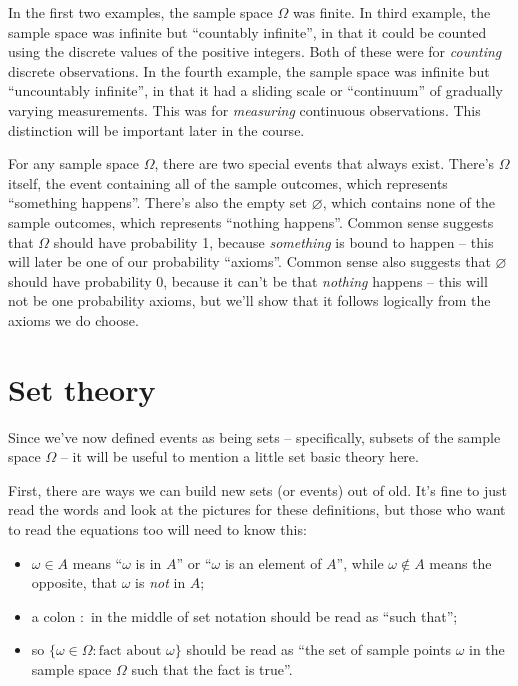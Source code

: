 \documentclass[
  letterpaper,
]{report}
\providecommand{\tightlist}{%
  \setlength{\itemsep}{0pt}\setlength{\parskip}{0pt}}\usepackage{longtable,booktabs,array}
\theoremstyle{definition}
\theoremstyle{definition}
\theoremstyle{remark}
\begin{document}
In the first two examples, the sample space \(\Omega\) was finite. In
third example, the sample space was infinite but ``countably infinite'',
in that it could be counted using the discrete values of the positive
integers. Both of these were for \emph{counting} discrete observations.
In the fourth example, the sample space was infinite but ``uncountably
infinite'', in that it had a sliding scale or ``continuum'' of gradually
varying measurements. This was for \emph{measuring} continuous
observations. This distinction will be important later in the course.

For any sample space \(\Omega\), there are two special events that
always exist. There's \(\Omega\) itself, the event containing all of the
sample outcomes, which represents ``something happens''. There's also
the empty set \(\varnothing\), which contains none of the sample
outcomes, which represents ``nothing happens''. Common sense suggests
that \(\Omega\) should have probability 1, because \emph{something} is
bound to happen -- this will later be one of our probability ``axioms''.
Common sense also suggests that \(\varnothing\) should have probability
0, because it can't be that \emph{nothing} happens -- this will not be
one probability axioms, but we'll show that it follows logically from
the axioms we do choose.

\hypertarget{set-theory}{%
\section{Set theory}\label{set-theory}}

Since we've now defined events as being sets -- specifically, subsets of
the sample space \(\Omega\) -- it will be useful to mention a little set
basic theory here.

First, there are ways we can build new sets (or events) out of old. It's
fine to just read the words and look at the pictures for these
definitions, but those who want to read the equations too will need to
know this:

\begin{itemize}
\tightlist
\item
  \(\omega \in A\) means ``\(\omega\) is in \(A\)'' or ``\(\omega\) is
  an element of \(A\)'', while \(\omega \not\in A\) means the opposite,
  that \(\omega\) is \emph{not} in \(A\);
\item
  a colon \(:\) in the middle of set notation should be read as ``such
  that'';
\item
  so \(\{\omega \in \Omega : \text{fact about $\omega$}\}\) should be
  read as ``the set of sample points \(\omega\) in the sample space
  \(\Omega\) such that the fact is true''.
\end{itemize}
\end{document}
